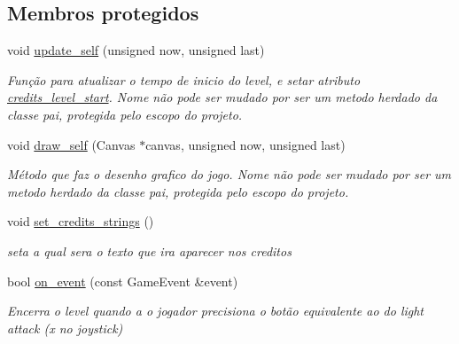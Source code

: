 \subsection*{Membros protegidos}
\begin{DoxyCompactItemize}
\item 
void \mbox{\hyperlink{classCreditsLevel_a2df0795f16916cab12337010ee18f46c}{update\+\_\+self}} (unsigned now, unsigned last)
\begin{DoxyCompactList}\small\item\em Função para atualizar o tempo de inicio do level, e setar atributo \mbox{\hyperlink{classCreditsLevel_ab7ac1647d977be5650daee20614bdede}{credits\+\_\+level\+\_\+start}}. Nome não pode ser mudado por ser um metodo herdado da classe pai, protegida pelo escopo do projeto. \end{DoxyCompactList}\item 
void \mbox{\hyperlink{classCreditsLevel_af980e138ebbad6f73b3835f38ee4dfe6}{draw\+\_\+self}} (Canvas $\ast$canvas, unsigned now, unsigned last)
\begin{DoxyCompactList}\small\item\em Método que faz o desenho grafico do jogo. Nome não pode ser mudado por ser um metodo herdado da classe pai, protegida pelo escopo do projeto. \end{DoxyCompactList}\item 
void \mbox{\hyperlink{classCreditsLevel_a627849460d0ed66cfdc491fbdd313388}{set\+\_\+credits\+\_\+strings}} ()
\begin{DoxyCompactList}\small\item\em seta a qual sera o texto que ira aparecer nos creditos \end{DoxyCompactList}\item 
bool \mbox{\hyperlink{classCreditsLevel_afa4ec08490398e3532fce7815c77aa46}{on\+\_\+event}} (const Game\+Event \&event)
\begin{DoxyCompactList}\small\item\em Encerra o level quando a o jogador precisiona o botão equivalente ao do light attack (x no joystick) \end{DoxyCompactList}\end{DoxyCompactItemize}
